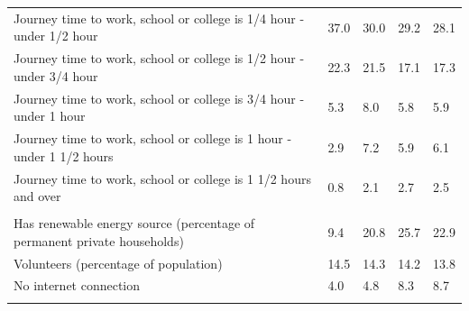 \documentclass{article}
\begin{document}
\begin{table}[h]
\begin{tabular}{KTTTT}
Journey time to work, school or college is 1/4 hour - under 1/2 hour & 37.0& 30.0& 29.2& 28.1\\
Journey time to work, school or college is 1/2 hour - under 3/4 hour & 22.3& 21.5& 17.1& 17.3\\
Journey time to work, school or college is 3/4 hour - under 1 hour & 5.3& 8.0& 5.8& 5.9\\
Journey time to work, school or college is 1 hour - under 1 1/2 hours & 2.9& 7.2& 5.9& 6.1\\
Journey time to work, school or college is 1 1/2 hours and over & 0.8& 2.1& 2.7& 2.5\\
\hline
    \\ 
    \hline
Has renewable energy source (percentage of permanent private households) &  9.4& 20.8& 25.7& 22.9\\
    \hline
Volunteers (percentage of population) & 14.5& 14.3& 14.2& 13.8\\
    \hline
No internet connection& 4.0& 4.8& 8.3& 8.7\\
\hline
\end{tabular}
\end{table}
\end{document}
